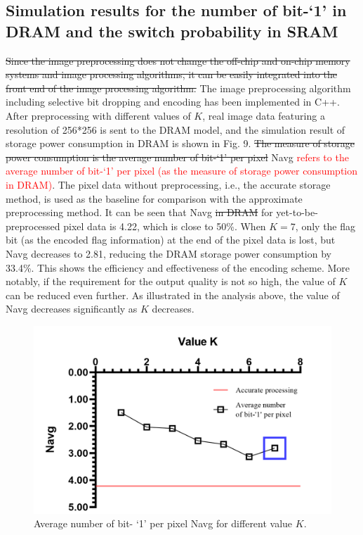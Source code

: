 \documentclass[lettersize,journal]{IEEEtran}
\begin{document}
\subsection{Simulation results for the number of bit-`1' in DRAM and the switch probability in SRAM}

{\color{red}\sout{Since the image preprocessing does not change the off-chip and on-chip memory systems and image processing algorithms, it can be easily integrated into the front end of the image processing algorithm.}} The image preprocessing algorithm including selective bit dropping and encoding has been implemented in C++. After preprocessing with different values of $K$, real image data featuring a resolution of 256*256 is sent to the DRAM model, and the simulation result of storage power consumption in DRAM is shown in Fig. 9. {\color{red}\sout{The measure of storage power consumption is the average number of bit-`1' per pixel}} Navg \textcolor{red}{refers to the average number of bit-`1' per pixel (as the measure of storage power consumption in DRAM)}. The pixel data without preprocessing, i.e., the accurate storage method, is used as the baseline for comparison with the approximate preprocessing method. It can be seen that Navg {\color{red}\sout{in DRAM}} for yet-to-be-preprocessed pixel data is 4.22, which is close to 50\%. When $K=7$, only the flag bit (as the encoded flag information) at the end of the pixel data is lost, but Navg decreases to 2.81, reducing the DRAM storage power consumption by 33.4\%. This shows the efficiency and effectiveness of the encoding scheme. More notably, if the requirement for the output quality is not so high, the value of $K$ can be reduced even further. As illustrated in the analysis above, the value of Navg decreases significantly as $K$ decreases.
\begin{figure}[htb]
\centering
\includegraphics[width=\linewidth]{Fig/Average number of bit- `1' per pixel Navg for different value k.png}
\caption{Average number of bit- `1' per pixel Navg for different value $K$.}
\label{fig9}
\end{figure}
\end{document}
